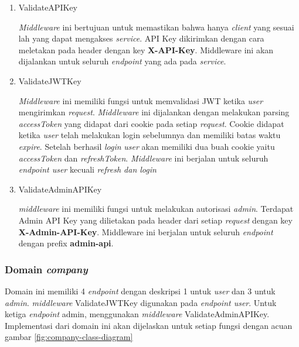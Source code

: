 \begin{enumerate}
  \item ValidateAPIKey

        \textit{Middleware} ini bertujuan untuk memastikan bahwa hanya \textit{client} yang sesuai lah yang dapat mengakses \textit{service}. API Key dikirimkan dengan cara meletakan pada header dengan key \textbf{X-API-Key}. Middleware ini akan dijalankan untuk seluruh \textit{endpoint} yang ada pada \textit{service}.

  \item ValidateJWTKey

        \textit{Middleware} ini memiliki fungsi untuk memvalidasi JWT ketika \textit{user} mengirimkan \textit{request}. \textit{Middleware} ini dijalankan dengan melakukan parsing \textit{accessToken} yang didapat dari cookie pada setiap \textit{request}. Cookie didapat ketika \textit{user} telah melakukan login sebelumnya dan memiliki batas waktu \textit{expire}. Setelah berhasil \textit{login} \textit{user} akan memiliki dua buah cookie yaitu \textit{accessToken} dan \textit{refreshToken}.  \textit{Middleware} ini berjalan untuk seluruh \textit{endpoint user} kecuali \textit{refresh dan login}


  \item ValidateAdminAPIKey

        \textit{middleware} ini memiliki fungsi untuk melakukan autorisasi \textit{admin}. Terdapat Admin API Key yang dilietakan pada header dari setiap \textit{request} dengan key \textbf{X-Admin-API-Key}. Middleware ini berjalan untuk seluruh \textit{endpoint} dengan prefix \textbf{admin-api}.
\end{enumerate}



\subsubsection{Domain \textit{company}}

Domain ini memiliki 4 \textit{endpoint} dengan deskripsi 1 untuk \textit{user} dan 3 untuk \textit{admin}. \textit{middleware} ValidateJWTKey digunakan pada \textit{endpoint user}. Untuk ketiga \textit{endpoint} admin, menggunakan \textit{middleware} ValidateAdminAPIKey. Implementasi dari domain ini akan dijelaskan untuk setiap fungsi dengan acuan gambar \ref{fig:company-class-diagram}


